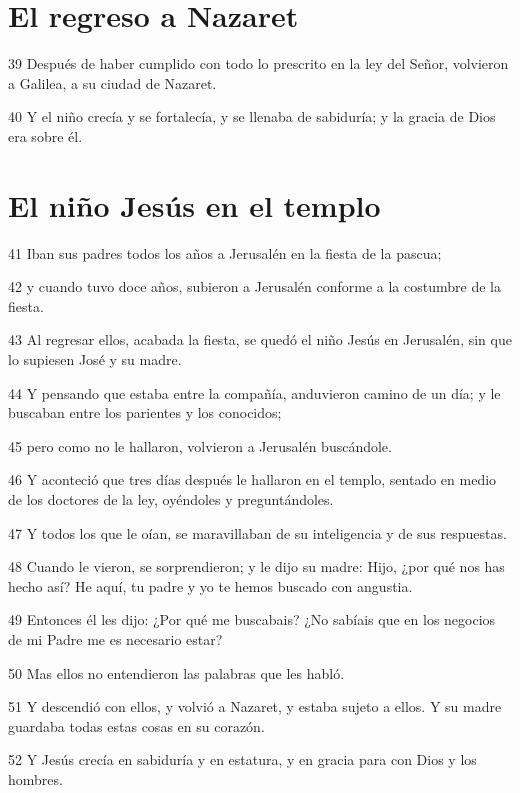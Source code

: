 \section*{El regreso a Nazaret}

\par 39 Después de haber cumplido con todo lo prescrito en la ley del Señor, volvieron a Galilea, a su ciudad de Nazaret.
\par 40 Y el niño crecía y se fortalecía, y se llenaba de sabiduría; y la gracia de Dios era sobre él.

\section*{El niño Jesús en el templo}

\par 41 Iban sus padres todos los años a Jerusalén en la fiesta de la pascua;
\par 42 y cuando tuvo doce años, subieron a Jerusalén conforme a la costumbre de la fiesta.
\par 43 Al regresar ellos, acabada la fiesta, se quedó el niño Jesús en Jerusalén, sin que lo supiesen José y su madre.
\par 44 Y pensando que estaba entre la compañía, anduvieron camino de un día; y le buscaban entre los parientes y los conocidos;
\par 45 pero como no le hallaron, volvieron a Jerusalén buscándole.
\par 46 Y aconteció que tres días después le hallaron en el templo, sentado en medio de los doctores de la ley, oyéndoles y preguntándoles.
\par 47 Y todos los que le oían, se maravillaban de su inteligencia y de sus respuestas.
\par 48 Cuando le vieron, se sorprendieron; y le dijo su madre: Hijo, ¿por qué nos has hecho así? He aquí, tu padre y yo te hemos buscado con angustia.
\par 49 Entonces él les dijo: ¿Por qué me buscabais? ¿No sabíais que en los negocios de mi Padre me es necesario estar?
\par 50 Mas ellos no entendieron las palabras que les habló.
\par 51 Y descendió con ellos, y volvió a Nazaret, y estaba sujeto a ellos. Y su madre guardaba todas estas cosas en su corazón.
\par 52 Y Jesús crecía en sabiduría y en estatura, y en gracia para con Dios y los hombres.

